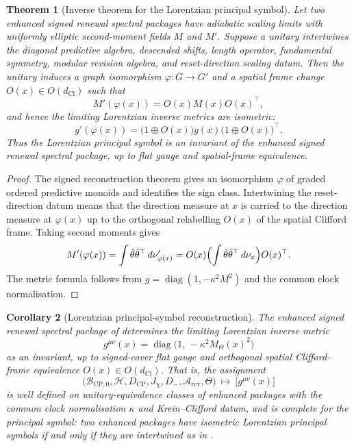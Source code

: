 \documentclass[11pt]{article}
\newtheorem{theorem}{Theorem}[section]
\newtheorem{corollary}[theorem]{Corollary}
\theoremstyle{definition}
\theoremstyle{remark}
\newcommand{\Arev}{\mathcal{A}_{\mathrm{rev}}}
\newcommand{\B}{\mathcal{B}}
\newcommand{\Hh}{\mathcal{H}}
\newcommand{\CP}{\mathrm{CP}}
\newcommand{\dCl}{d_{\mathrm{Cl}}}
\newcommand{\diag}{\operatorname{diag}}
\begin{document}
\begin{theorem}[Inverse theorem for the Lorentzian principal symbol]
\label{thm:metric-reconstruction}
Let two enhanced signed renewal spectral packages have adiabatic scaling limits
with uniformly elliptic second-moment fields \(M\) and \(M'\).  Suppose a unitary
intertwines the diagonal predictive algebra, descended shifts, length operator,
fundamental symmetry, modular revision algebra, and reset-direction scaling
datum.  Then the unitary induces a graph isomorphism \(\varphi:G\to G'\) and a
spatial frame change \(O(x)\in O(\dCl)\) such that
\[
  M'(\varphi(x))=O(x)M(x)O(x)^{\top},
\]
and hence the limiting Lorentzian inverse metrics are isometric:
\[
  g'(\varphi(x))
  =\bigl(1\oplus O(x)\bigr)g(x)\bigl(1\oplus O(x)\bigr)^{\top}.
\]
Thus the Lorentzian principal symbol is an invariant of the enhanced signed
renewal spectral package, up to flat gauge and spatial-frame equivalence.
\end{theorem}

\begin{proof}
The signed reconstruction theorem  gives an
isomorphism \(\varphi\) of graded ordered predictive monoids and identifies the
sign class.  Intertwining the reset-direction datum means that the direction
measure at \(x\) is carried to the direction measure at \(\varphi(x)\) up to the
orthogonal relabelling \(O(x)\) of the spatial Clifford frame.  Taking second
moments gives
\[
  M'(\varphi(x))
  =\int \hat\theta\hat\theta^{\top}\,d\nu'_{\varphi(x)}
  =O(x)\Bigl(\int \hat\theta\hat\theta^{\top}\,d\nu_x\Bigr)O(x)^{\top}.
\]
The metric formula follows from
\(g=\diag(1,-\kappa^2M^2)\) and the common clock normalisation.
\end{proof}

\begin{corollary}[Lorentzian principal-symbol reconstruction]
\label{cor:symbol-reconstruction}
The enhanced signed renewal spectral package of 
determines the limiting Lorentzian inverse metric
\[
  g^{\mu\nu}(x)=\operatorname{diag}\bigl(1,\,-\kappa^2 M_\Theta(x)^2\bigr)
\]
as an invariant, up to signed-cover flat gauge and orthogonal spatial
Clifford-frame equivalence $O(x)\in O(\dCl)$.  That is, the assignment
\[
  \bigl(\B_{\CP,0},\Hh,D_{\CP},J_\chi,D_-,\Arev,\Theta\bigr)
  \ \longmapsto\ \bigl[g^{\mu\nu}(x)\bigr]
\]
is well defined on unitary-equivalence classes of enhanced packages with the
common clock normalisation $\kappa$ and Krein--Clifford datum, and is complete
for the principal symbol: two enhanced packages have isometric Lorentzian
principal symbols if and only if they are intertwined as in
.
\end{corollary}
\end{document}
